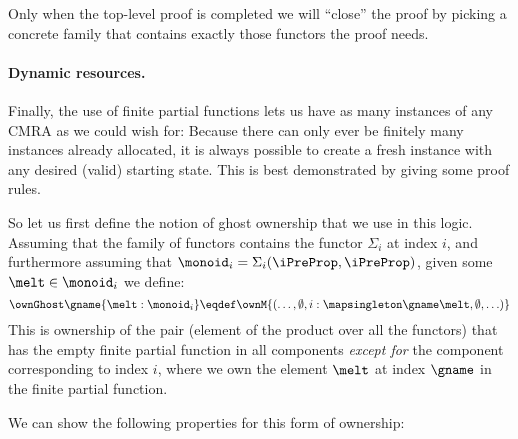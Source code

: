 Only when the top-level proof is completed we will ``close'' the proof by picking a concrete family that contains exactly those functors the proof needs.

\paragraph{Dynamic resources.}
Finally, the use of finite partial functions lets us have as many instances of any CMRA as we could wish for:
Because there can only ever be finitely many instances already allocated, it is always possible to create a fresh instance with any desired (valid) starting state.
This is best demonstrated by giving some proof rules.

So let us first define the notion of ghost ownership that we use in this logic.
Assuming that the family of functors contains the functor $\Sigma_i$ at index $i$, and furthermore assuming that $\monoid_i = \Sigma_i(\iPreProp, \iPreProp)$, given some $\melt \in \monoid_i$ we define:
\[ \ownGhost\gname{\melt:\monoid_i} \eqdef \ownM{(\ldots, \emptyset, i:\mapsingleton \gname \melt, \emptyset, \ldots)} \]
This is ownership of the pair (element of the product over all the functors) that has the empty finite partial function in all components \emph{except for} the component corresponding to index $i$, where we own the element $\melt$ at index $\gname$ in the finite partial function.

We can show the following properties for this form of ownership:

